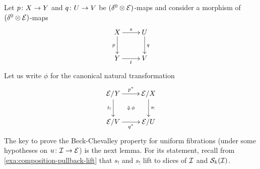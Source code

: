 \documentclass[reqno,10pt,a4paper,oneside,draft]{amsart}
\begin{document}

Let $p \co X \to Y$ and $q \co U \to V$ be $(\lcyl \otimes \catE)$-maps and consider a 
morphism of $(\lcyl \otimes \catE)$-maps
\begin{equation} \label{strong-h-equiv-base-change-along-fibration-BC:0}
\begin{gathered}
\xymatrix{
X \ar[r]^s \ar[d]_{p} & U \ar[d]^{q} \\
Y \ar[r]_t & V}
\end{gathered}
\end{equation}
Let us write $\phi$ for the canonical natural transformation 
\begin{equation} \label{strong-h-equiv-base-change-along-fibration-BC:1}
\begin{gathered}
\xymatrix{
  \catE/Y
  \ar[r]^{p^*} 
  \ar[d]_{t_!}
  \ar@{}[dr]|{\Downarrow \, \phi}
&
  \catE/X
  \ar[d]^{s_!}
\\
  \catE/V
  \ar[r]_{q^*} 
&
  \catE/U
}
\end{gathered}
\end{equation}
The key to prove the Beck-Chevalley property for uniform fibrations (under some hypotheses on $u \co \cal{I} \to \cal{E}$)
is the next lemma.  For its statement, recall from \cref{exa:composition-pullback-lift} that $s_!$ and $s_!$ lift 
to slices of $\cal{I}$ and $\cal{S}_k(\cal{I})$. 

\end{document}
